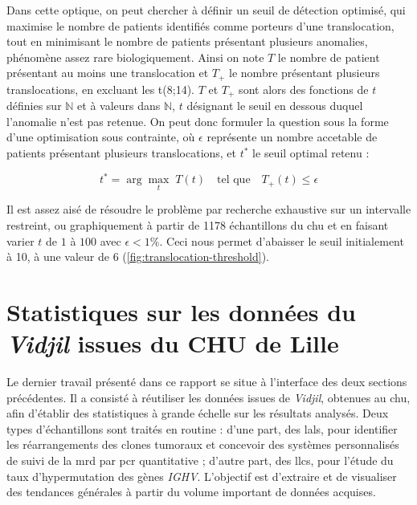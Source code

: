 \vspace{1em}

Dans cette optique, on peut chercher à définir un seuil de détection optimisé, qui maximise le nombre de patients identifiés comme porteurs d'une translocation, 
tout en minimisant le nombre de patients présentant plusieurs anomalies, phénomène assez rare biologiquement. Ainsi on note $T$ le nombre de patient 
présentant au moins une translocation et $T_{+}$ le nombre présentant plusieurs translocations, en excluant les t(8;14). $T$ et $T_{+}$ sont alors des fonctions 
de $t$ définies sur $\mathbb{N}$ et à valeurs dans $\mathbb{N}$, $t$ désignant le seuil en dessous duquel l'anomalie n'est pas retenue. On peut donc formuler la question sous la forme d'une optimisation sous contrainte, 
où $\epsilon$ représente un nombre accetable de patients présentant plusieurs translocations, et $t^*$ le seuil optimal retenu :

\begin{equation}
    t^* = \arg\max_{t} \; T(t) \quad \text{tel que} \quad T_{+}(t) \leq \epsilon
 \end{equation}
    
 Il est assez aisé de résoudre le problème par recherche exhaustive sur un intervalle restreint, ou graphiquement à partir de 1178 échantillons du \gls{chu} et en faisant varier 
 $t$ de $1$ à $100$ avec $\epsilon < 1 \%$. Ceci nous permet d'abaisser le seuil initialement à 10, à une valeur de 6 (\autoref{fig:translocation-threshold}).



\section{Statistiques sur les données du \textit{Vidjil} issues du CHU de Lille}

Le dernier travail présenté dans ce rapport se situe à l'interface des deux sections précédentes. Il a consisté à réutiliser les données issues de \textit{Vidjil}, obtenues au \gls{chu}, 
afin d'établir des statistiques à grande échelle sur les résultats analysés. Deux types d'échantillons sont traités en routine : d'une part, des \glspl{lal}, pour identifier les 
réarrangements des clones tumoraux et concevoir des systèmes personnalisés de suivi de la \gls{mrd} par \gls{pcr} quantitative ; d'autre part, des \glspl{llc}, pour l'étude du taux 
d'hypermutation des gènes \textit{IGHV}. L'objectif est d'extraire et de visualiser des tendances générales à partir du volume important de données acquises.

